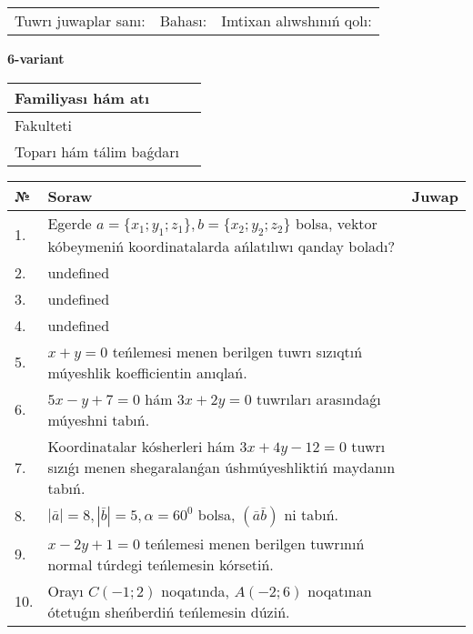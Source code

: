 \documentclass{article}
\begin{document}
\vspace{0.7cm}

\begin{tabular}{lll}
Tuwrı juwaplar sanı: \underline{\hspace{1cm}} & 
Bahası: \underline{\hspace{1cm}} & 
Imtixan alıwshınıń qolı: \underline{\hspace{2cm}} \\
\end{tabular}

\egroup

\newpage


\textbf{6-variant}\\

\bgroup
\def\arraystretch{1.6} %

\begin{tabular}{|m{5.7cm}|m{9.5cm}|}
\hline
Familiyası hám atı & \\
\hline
Fakulteti  & \\
\hline
Toparı hám tálim baǵdarı  & \\
\hline
\end{tabular}

\vspace{0.7cm}

\begin{tabular}{|m{0.7cm}|m{10cm}|m{4cm}|}
\hline
№ & Soraw & Juwap \\
\hline
1. & Egerde \(a = \{ x_{1}; y_{1}; z_{1}\}, b = \{ x_{2}; y_{2}; z_{2}\}\) bolsa, vektor kóbeymeniń koordinatalarda ańlatılıwı qanday boladı? &  \\
\hline
2. & undefined &  \\
\hline
3. & undefined &  \\
\hline
4. & undefined &  \\
\hline
5. & \(x + y = 0\) teńlemesi menen berilgen tuwrı sızıqtıń múyeshlik koefficientin anıqlań. &  \\
\hline
6. & \(5 x - y + 7 = 0\) hám \(3 x + 2 y = 0\) tuwrıları arasındaǵı múyeshni tabıń. &  \\
\hline
7. & Koordinatalar kósherleri hám \( 3 x + 4 y - 12 = 0 \) tuwrı sızıǵı menen shegaralanǵan úshmúyeshliktiń maydanın tabıń. &  \\
\hline
8. & \(\left| \bar{a} \right| = 8, \left| \bar{b} \right| = 5, \alpha = 60^{0}\) bolsa, \(( \bar{a}\bar{b} )\) ni tabıń. &  \\
\hline
9. & \(x - 2 y + 1 = 0\) teńlemesi menen berilgen tuwrınıń normal túrdegi teńlemesin kórsetiń. &  \\
\hline
10. & Orayı \(C (- 1;2)\) noqatında, \(A (- 2;6 )\) noqatınan ótetuǵın sheńberdiń teńlemesin dúziń. & \\
\hline
\end{tabular}
\end{document}
